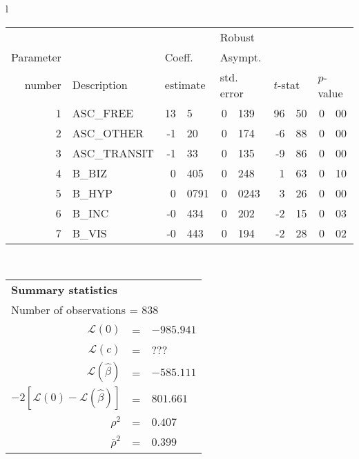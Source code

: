   \begin{tabular}{l}
\begin{tabular}{rlr@{.}lr@{.}lr@{.}lr@{.}l}
         &                       &   \multicolumn{2}{l}{}    & \multicolumn{2}{l}{Robust}  &     \multicolumn{4}{l}{}   \\
Parameter &                       &   \multicolumn{2}{l}{Coeff.}      & \multicolumn{2}{l}{Asympt.}  &     \multicolumn{4}{l}{}   \\
number &  Description                     &   \multicolumn{2}{l}{estimate}      & \multicolumn{2}{l}{std. error}  &   \multicolumn{2}{l}{$t$-stat}  &   \multicolumn{2}{l}{$p$-value}   \\

\hline

1 & ASC\_FREE & 13&5 & 0&139 & 96&50 & 0&00 \\
2 & ASC\_OTHER & -1&20 & 0&174 & -6&88 & 0&00 \\
3 & ASC\_TRANSIT & -1&33 & 0&135 & -9&86 & 0&00 \\
4 & B\_BIZ & 0&405 & 0&248 & 1&63 & 0&10 \\
5 & B\_HYP & 0&0791 & 0&0243 & 3&26 & 0&00 \\
6 & B\_INC & -0&434 & 0&202 & -2&15 & 0&03 \\
7 & B\_VIS & -0&443 & 0&194 & -2&28 & 0&02 \\
\hline

\end{tabular}
\\
\begin{tabular}{rcl}
\multicolumn{3}{l}{\bf Summary statistics}\\
\multicolumn{3}{l}{ Number of observations = $838$} \\
 $\mathcal{L}(0)$ &=&  $-985.941$ \\
 $\mathcal{L}(c)$ &=& ???\\
 $\mathcal{L}(\hat{\beta})$ &=& $-585.111 $  \\
 $-2[\mathcal{L}(0) -\mathcal{L}(\hat{\beta})]$ &=& $801.661$ \\
    $\rho^2$ &=&   $0.407$ \\
    $\bar{\rho}^2$ &=&    $0.399$ \\
\end{tabular}
\end{tabular}


